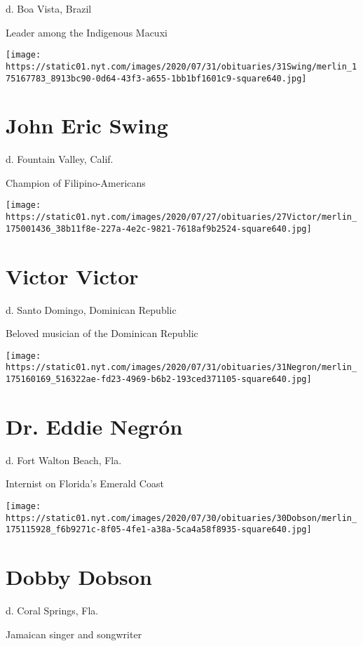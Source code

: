 d. Boa Vista, Brazil

Leader among the Indigenous Macuxi

\texttt{[image: https://static01.nyt.com/images/2020/07/31/obituaries/31Swing/merlin\_175167783\_8913bc90-0d64-43f3-a655-1bb1bf1601c9-square640.jpg]}

\hypertarget{john-eric-swing}{%
\section{John Eric Swing}\label{john-eric-swing}}

d. Fountain Valley, Calif.

Champion of Filipino-Americans

\texttt{[image: https://static01.nyt.com/images/2020/07/27/obituaries/27Victor/merlin\_175001436\_38b11f8e-227a-4e2c-9821-7618af9b2524-square640.jpg]}

\hypertarget{victor-victor}{%
\section{Victor Victor}\label{victor-victor}}

d. Santo Domingo, Dominican Republic

Beloved musician of the Dominican Republic

\texttt{[image: https://static01.nyt.com/images/2020/07/31/obituaries/31Negron/merlin\_175160169\_516322ae-fd23-4969-b6b2-193ced371105-square640.jpg]}

\hypertarget{dr-eddie-negruxf3n}{%
\section{Dr. Eddie Negrón}\label{dr-eddie-negruxf3n}}

d. Fort Walton Beach, Fla.

Internist on Florida's Emerald Coast

\texttt{[image: https://static01.nyt.com/images/2020/07/30/obituaries/30Dobson/merlin\_175115928\_f6b9271c-8f05-4fe1-a38a-5ca4a58f8935-square640.jpg]}

\hypertarget{dobby-dobson}{%
\section{Dobby Dobson}\label{dobby-dobson}}

d. Coral Springs, Fla.

Jamaican singer and songwriter

